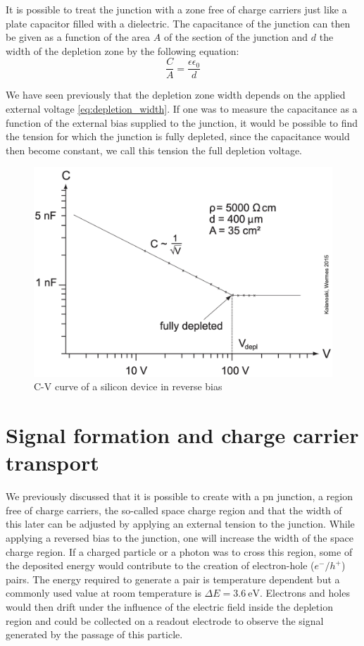 	It is possible to treat the junction with a zone free of charge carriers just like a plate capacitor filled with a dielectric. The capacitance of the junction can then be given as a function of the area $A$ of the section of the junction and $d$ the width of the depletion zone by the following equation: 
		\begin{equation}
			\frac{C}{A} = \frac{\epsilon \epsilon_0}{d}
		\end{equation}

	We have seen previously that the depletion zone width depends on the applied external voltage \eqref{eq:depletion_width}. If one was to measure the capacitance as a function of the external bias supplied to the junction, it would be possible to find the tension for which the junction is fully depleted, since the capacitance would then become constant, we call this tension the full depletion voltage. 
	\begin{figure}[h]
		\centering
			\includegraphics[width=0.6\linewidth]{files/CV_silicon}
			\caption{C-V curve of a silicon device in reverse bias}
			\label{ }
	\end{figure}

	
	\clearpage
	\section{Signal formation and charge carrier transport}\label{sec:2.2}
		
	We previously discussed that it is possible to create with a pn junction, a region free of charge carriers, the so-called space charge region and that the width of this later can be adjusted by applying an external tension to the junction. While applying a reversed bias to the junction, one will increase the width of the space charge region. If a charged particle or a photon was to cross this region, some of the deposited energy would contribute to the creation of electron-hole ($e^- / h^+$) pairs. The energy required to generate a pair is temperature dependent but a commonly used value at room temperature is $\Delta E = \SI{3.6}{\electronvolt}$. Electrons and holes would then drift under the influence of the electric field inside the depletion region and could be collected on a readout electrode to observe the signal generated by the passage of this particle. 

